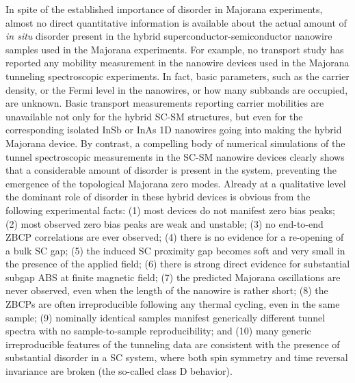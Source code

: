 \documentclass[aps,prmaterials,twocolumn,superscriptaddress,longbibliography]{revtex4-2}
\begin{document}
In spite of the established importance of disorder in Majorana experiments, almost no direct quantitative information is available about the actual amount of \textit{in situ} disorder present in the hybrid superconductor-semiconductor nanowire samples used in the Majorana experiments.  For example, no transport study has reported any mobility measurement in the nanowire devices used in the Majorana tunneling spectroscopic experiments.  In fact, basic parameters, such as the carrier density, or the Fermi level in the nanowires, or how many subbands are occupied, are unknown.  Basic transport measurements reporting carrier mobilities are unavailable not only for the hybrid SC-SM structures, but even for the corresponding isolated InSb or InAs 1D nanowires going into making the hybrid Majorana device.  By contrast, a compelling body of numerical simulations of the tunnel spectroscopic measurements in the SC-SM nanowire devices clearly shows that a considerable amount of disorder is present in the system, preventing the emergence of the topological Majorana zero modes.  Already at a qualitative level the dominant role of disorder in these hybrid devices is obvious from the following experimental facts: (1) most devices do not manifest zero bias peaks; (2) most observed zero bias peaks are weak and unstable; (3) no end-to-end ZBCP correlations are ever observed; (4) there is no evidence for a re-opening of a bulk SC gap; (5) the  induced SC proximity gap becomes soft and very small in the presence of the applied field; (6) there is strong direct evidence for substantial subgap ABS at finite magnetic field; (7) the predicted Majorana oscillations are never observed, even when the length of the nanowire is rather short; (8) the ZBCPs are often irreproducible following any thermal cycling, even in the same sample; (9) nominally identical samples manifest generically different tunnel spectra with no sample-to-sample reproducibility; and (10) many generic irreproducible features of the tunneling data are consistent with the presence of substantial disorder in a SC system, where both spin symmetry and time reversal invariance are broken (the so-called class D behavior). 
\end{document}
